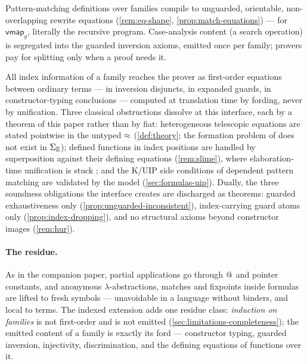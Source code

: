 \begin{description}[leftmargin=2em]
\item[S5 (Definitions as oriented computation).]  Pattern-matching
  definitions over families compile to unguarded, orientable,
  non-overlapping rewrite equations (\cref{rem:eq-shape},
  \cref{prop:match-equations}) --- for $\mathsf{vmap}_g$, literally the
  recursive program.  Case-analysis content (a search operation) is
  segregated into the guarded inversion axioms, emitted once per family;
  provers pay for splitting only when a proof needs it.

\item[S6 (Index constraints as equations, stated not solved).]  All
  index information of a family reaches the prover as first-order
  equations between ordinary terms --- in inversion disjuncts, in
  expanded guards, in constructor-typing conclusions --- computed at
  translation time by fording, never by unification.  Three classical
  obstructions dissolve at this interface, each by a theorem of this
  paper rather than by fiat: heterogeneous telescopic equations are
  stated pointwise in the untyped $\approx$ (\cref{def:theory}; the
  formation problem of \cite{McBride1999} does not exist in $\Sigma_{\mathbb{E}}$);
  defined functions in index positions are handled by superposition
  against their defining equations (\cref{rem:slime}), where
  elaboration-time unification is stuck \cite{McBride2014}; and the
  K/UIP side conditions of dependent pattern matching are validated by
  the model (\cref{sec:formulas-uip}).  Dually, the three soundness
  obligations the interface creates are discharged as theorems:
  guarded exhaustiveness only (\cref{prop:unguarded-inconsistent}),
  index-carrying guard atoms only (\cref{prop:index-dropping}), and
  no structural axioms beyond constructor images
  (\cref{rem:hur}).
\end{description}

\paragraph{The residue.}  As in the companion paper, partial
applications go through $\mathbin{@}$ and pointer constants, and anonymous
$\lambda$-abstractions, matches and fixpoints inside formulas are lifted
to fresh symbols --- unavoidable in a language without binders, and
local to terms.  The indexed extension adds one residue class:
\emph{induction on families} is not first-order and is not emitted
(\cref{sec:limitations-completeness}); the emitted content of a family
is exactly its ford --- constructor typing, guarded inversion,
injectivity, discrimination, and the defining equations of functions
over it.
